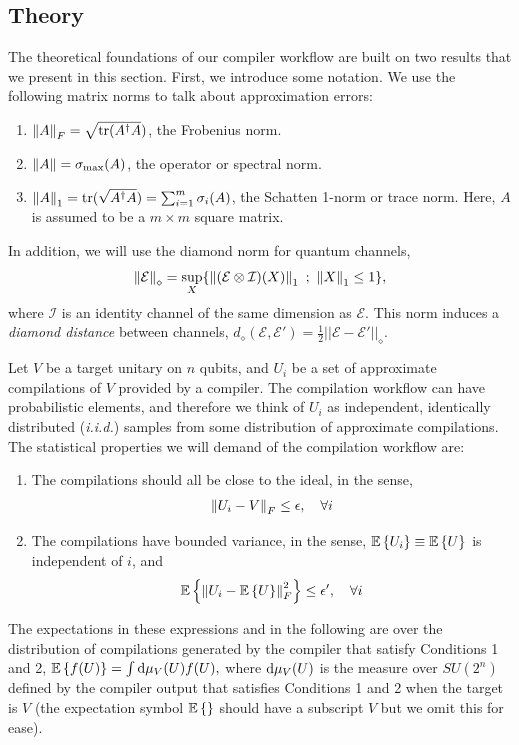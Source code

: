 
\subsection*{Theory}
The theoretical foundations of our compiler workflow are built on two results that we present in this section. First, we introduce some notation. We use the following matrix norms to talk about approximation errors:
\begin{enumerate}
	\item $\left\lVert A \right\rVert_F = \sqrt{{\rm tr}(A^\dagger A})$, the Frobenius norm. 
	\item $\left\lVert A \right\rVert = \sigma_{\rm max}(A)$, the operator or spectral norm. 
	\item $\left\lVert A \right\rVert_1 = {\rm tr}(\sqrt{A^\dagger A}) = \sum_{i=1}^m \sigma_i(A)$, the Schatten 1-norm or trace norm. Here, $A$ is assumed to be a $m\times m$ square matrix.
\end{enumerate}
In addition, we will use the diamond norm for quantum channels,
\begin{align}
	\left\lVert \mathcal{E} \right\rVert_\diamond = \sup_X \{ \left\lVert (\mathcal{E}\otimes \mathcal{I})(X) \right\rVert_1 ~;~ \left\lVert X \right\rVert_1\leq 1 \},
\end{align}
where $\mathcal{I}$ is an identity channel of the same dimension as $\mathcal{E}$. This norm induces a \emph{diamond distance} between channels, $d_\diamond(\mathcal{E}, \mathcal{E}') = \frac{1}{2}||\mathcal{E} - \mathcal{E}'||_{\diamond}$.

Let $V$ be a target unitary on $n$ qubits, and $U_i$ be a set of approximate compilations of $V$ provided by a compiler. The compilation workflow can have probabilistic elements, and therefore we think of $U_i$ as independent, identically distributed (\emph{i.i.d.}) samples from some distribution of approximate compilations. The statistical properties we will demand of the compilation workflow are:
\begin{enumerate}
\item The compilations should all be close to the ideal, in the sense,
    \begin{align}
	\left\lVert U_i-V \right\rVert_F \leq \epsilon, \quad \forall i		
		\label{eq:ass1}
	\end{align}
	\item The compilations have bounded variance, in the sense, $\mathbb{E}\left\{ U_i \right\} \equiv \mathbb{E}\left\{ U \right\}$ is independent of $i$, and
	\begin{align}
		\mathbb{E}\left\{ \left\lVert U_i - \mathbb{E}\left\{ U \right\} \right\rVert_F^2 \right\} \leq \epsilon', \quad \forall i
		\label{eq:ass2}
	\end{align}
\end{enumerate}
The expectations in these expressions and in the following are over the distribution of compilations generated by the compiler that satisfy Conditions 1 and 2, \ie
$ \mathbb{E}\left\{ f(U) \right\} = \int {\rm d}\mu_V(U) f(U), $
where ${\rm d}\mu_V(U)$ is the measure over $SU(2^n)$ defined by the compiler output that satisfies Conditions 1 and 2 when the target is $V$ (the expectation symbol $\mathbb{E}\left\{  \right\}$ should have a subscript $V$ but we omit this for ease).

